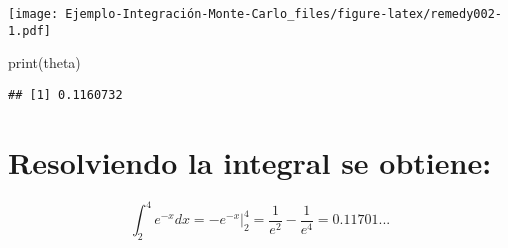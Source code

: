 \documentclass[
]{article}
\newenvironment{Shaded}{\begin{snugshade}}{\end{snugshade}}
\newcommand{\FunctionTok}[1]{\textcolor[rgb]{0.00,0.00,0.00}{#1}}
\newcommand{\NormalTok}[1]{#1}
\begin{document}
\texttt{[image: Ejemplo-Integración-Monte-Carlo\_files/figure-latex/remedy002-1.pdf]}

\begin{Shaded}
\begin{Highlighting}[]
\FunctionTok{print}\NormalTok{(theta)}
\end{Highlighting}
\end{Shaded}

\begin{verbatim}
## [1] 0.1160732
\end{verbatim}

\hypertarget{resolviendo-la-integral-se-obtiene}{%
\section{Resolviendo la integral se
obtiene:}\label{resolviendo-la-integral-se-obtiene}}

\[
\int_2^4 e^{-x} d x=-e^{-x}\Big|_2^4=\frac{1}{e^2}-\frac{1}{e^4}= 0.11701...
\]
\end{document}
